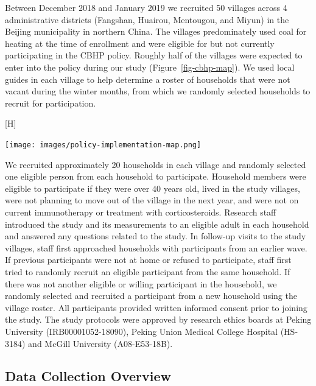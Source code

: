 \documentclass[
  letterpaper,
  DIV=11,
  numbers=noendperiod]{scrartcl}
\makeatletter
\renewenvironment{figure}%
   {\renewcommand\familydefault\sfdefault
    \@float{figure}}
   {\end@float}
\makeatother
\begin{document}
Between December 2018 and January 2019 we recruited 50 villages across 4
administrative districts (Fangshan, Huairou, Mentougou, and Miyun) in
the Beijing municipality in northern China. The villages predominately
used coal for heating at the time of enrollment and were eligible for
but not currently participating in the CBHP policy. Roughly half of the
villages were expected to enter into the policy during our study
(Figure~\ref{fig-cbhp-map}). We used local guides in each village to
help determine a roster of households that were not vacant during the
winter months, from which we randomly selected households to recruit for
participation.

\begin{figure}[H]

{\centering \texttt{[image: images/policy-implementation-map.png]}

}

\caption{\label{fig-cbhp-map}Map of village implementation of CBHP
policy}

\end{figure}

We recruited approximately 20 households in each village and randomly
selected one eligible person from each household to participate.
Household members were eligible to participate if they were over 40
years old, lived in the study villages, were not planning to move out of
the village in the next year, and were not on current immunotherapy or
treatment with corticosteroids. Research staff introduced the study and
its measurements to an eligible adult in each household and answered any
questions related to the study. In follow-up visits to the study
villages, staff first approached households with participants from an
earlier wave. If previous participants were not at home or refused to
participate, staff first tried to randomly recruit an eligible
participant from the same household. If there was not another eligible
or willing participant in the household, we randomly selected and
recruited a participant from a new household using the village roster.
All participants provided written informed consent prior to joining the
study. The study protocols were approved by research ethics boards at
Peking University (IRB00001052-18090), Peking Union Medical College
Hospital (HS-3184) and McGill University (A08-E53-18B).

\hypertarget{data-collection-overview}{%
\subsection{Data Collection Overview}\label{data-collection-overview}}
\end{document}
